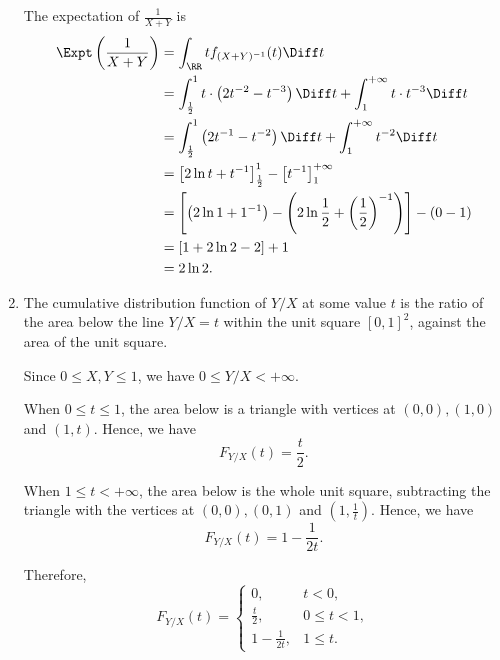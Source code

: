 \begin{enumerate}
          The expectation of \(\frac{1}{X + Y}\) is
          \begin{align*}
              \Expt\left(\frac{1}{X + Y}\right) & = \int_{\RR} t f_{(X + Y)^{-1}}(t) \Diff t                                                                              \\
                                                & = \int_{\frac{1}{2}}^{1} t \cdot \left(2t^{-2} - t^{-3}\right) \Diff t + \int_{1}^{+\infty} t \cdot t^{-3} \Diff t      \\
                                                & = \int_{\frac{1}{2}}^{1} \left(2t^{-1} - t^{-2}\right) \Diff t + \int_{1}^{+\infty} t^{-2} \Diff t                      \\
                                                & = \left[2 \ln t + t^{-1}\right]_{\frac{1}{2}}^{1} - \left[t^{-1}\right]_{1}^{+\infty}                                   \\
                                                & = \left[\left(2 \ln 1 + 1^{-1}\right) - \left(2 \ln \frac{1}{2} + \left(\frac{1}{2}\right)^{-1}\right)\right] - (0 - 1) \\
                                                & = \left[1 + 2 \ln 2 - 2\right] + 1                                                                                      \\
                                                & = 2 \ln 2.
          \end{align*}

    \item The cumulative distribution function of \(Y / X\) at some value \(t\) is the ratio of the area below the line \(Y / X = t\) within the unit square \([0, 1]^2\), against the area of the unit square.

          Since \(0 \leq X, Y \leq 1\), we have \(0 \leq Y / X < +\infty\).

          When \(0 \leq t \leq 1\), the area below is a triangle with vertices at \((0, 0), (1, 0)\) and \((1, t)\). Hence, we have
          \[
              F_{Y / X} (t) = \frac{t}{2}.
          \]

          When \(1 \leq t < +\infty\), the area below is the whole unit square, subtracting the triangle with the vertices at \((0, 0), (0, 1)\) and \(\left(1, \frac{1}{t}\right)\). Hence, we have
          \[
              F_{Y / X} (t) = 1 - \frac{1}{2t}.
          \]

          Therefore,
          \[
              F_{Y / X} (t) = \begin{cases}
                  0,                & t < 0,        \\
                  \frac{t}{2},      & 0 \leq t < 1, \\
                  1 - \frac{1}{2t}, & 1 \leq t.
              \end{cases}
          \]


\end{enumerate}
